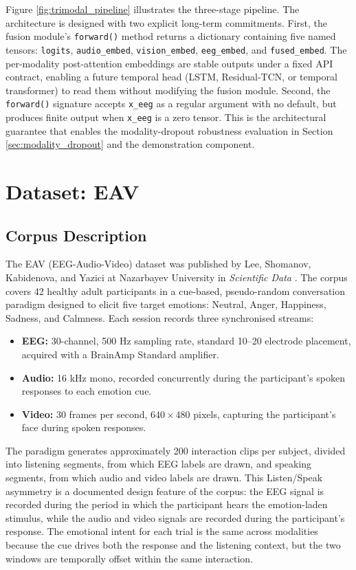 Figure \ref{fig:trimodal_pipeline} illustrates the three-stage pipeline. The architecture is designed with two explicit long-term commitments. First, the fusion module's \texttt{forward()} method returns a dictionary containing five named tensors: \texttt{logits}, \texttt{audio\_embed}, \texttt{vision\_embed}, \texttt{eeg\_embed}, and \texttt{fused\_embed}. The per-modality post-attention embeddings are stable outputs under a fixed API contract, enabling a future temporal head (LSTM, Residual-TCN, or temporal transformer) to read them without modifying the fusion module. Second, the \texttt{forward()} signature accepts \texttt{x\_eeg} as a regular argument with no default, but produces finite output when \texttt{x\_eeg} is a zero tensor. This is the architectural guarantee that enables the modality-dropout robustness evaluation in Section \ref{sec:modality_dropout} and the demonstration component.

\section{Dataset: EAV}
\subsection{Corpus Description}
The EAV (EEG-Audio-Video) dataset was published by Lee, Shomanov, Kabidenova, and Yazici at Nazarbayev University in \textit{Scientific Data} \cite{Lee2024EAV}. The corpus covers 42 healthy adult participants in a cue-based, pseudo-random conversation paradigm designed to elicit five target emotions: Neutral, Anger, Happiness, Sadness, and Calmness. Each session records three synchronised streams:

\begin{itemize}
    \item \textbf{EEG:} 30-channel, 500 Hz sampling rate, standard 10--20 electrode placement, acquired with a BrainAmp Standard amplifier.
    \item \textbf{Audio:} 16 kHz mono, recorded concurrently during the participant's spoken responses to each emotion cue.
    \item \textbf{Video:} 30 frames per second, $640\times480$ pixels, capturing the participant's face during spoken responses.
\end{itemize}

The paradigm generates approximately 200 interaction clips per subject, divided into listening segments, from which EEG labels are drawn, and speaking segments, from which audio and video labels are drawn. This Listen/Speak asymmetry is a documented design feature of the corpus: the EEG signal is recorded during the period in which the participant hears the emotion-laden stimulus, while the audio and video signals are recorded during the participant's response. The emotional intent for each trial is the same across modalities because the cue drives both the response and the listening context, but the two windows are temporally offset within the same interaction.

